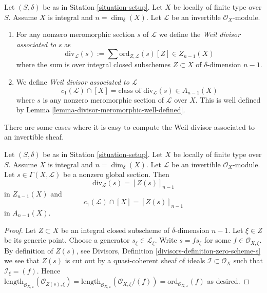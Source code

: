 \begin{definition}
\label{definition-divisor-invertible-sheaf}
Let $(S, \delta)$ be as in Sitation \ref{situation-setup}.
Let $X$ be locally of finite type over $S$. Assume $X$ is
integral and $n = \dim_\delta(X)$.
Let $\mathcal{L}$ be an invertible $\mathcal{O}_X$-module.
\begin{enumerate}
\item For any nonzero meromorphic section $s$ of $\mathcal{L}$
we define the {\it Weil divisor associated to $s$} as
$$
\text{div}_{\mathcal{L}}(s) :=
\sum \text{ord}_{Z, \mathcal{L}}(s) [Z] \in Z_{n - 1}(X)
$$
where the sum is over integral closed subschemes $Z \subset X$
of $\delta$-dimension $n - 1$.
\item We define {\it Weil divisor associated to $\mathcal{L}$}
$$
c_1(\mathcal{L}) \cap [X] =
\text{class of }\text{div}_{\mathcal{L}}(s) \in A_{n - 1}(X)
$$
where $s$ is any nonzero meromorphic section of $\mathcal{L}$ over
$X$. This is well defined by
Lemma \ref{lemma-divisor-meromorphic-well-defined}.
\end{enumerate}
\end{definition}

\noindent
There are some cases where it is easy to compute the
Weil divisor associated to an invertible sheaf.

\begin{lemma}
\label{lemma-compute-c1}
Let $(S, \delta)$ be as in Sitation \ref{situation-setup}.
Let $X$ be locally of finite type over $S$. Assume $X$ is
integral and $n = \dim_\delta(X)$.
Let $\mathcal{L}$ be an invertible $\mathcal{O}_X$-module.
Let $s \in \Gamma(X, \mathcal{L})$ be a nonzero global section.
Then
$$
\text{div}_{\mathcal{L}}(s) = [Z(s)]_{n - 1}
$$
in $Z_{n - 1}(X)$ and
$$
c_1(\mathcal{L}) \cap [X] = [Z(s)]_{n - 1}
$$
in $A_{n - 1}(X)$.
\end{lemma}

\begin{proof}
Let $Z \subset X$ be an integral closed subscheme of
$\delta$-dimension $n - 1$. Let $\xi \in Z$ be its generic
point. Choose a generator $s_\xi \in \mathcal{L}_\xi$.
Write $s = fs_\xi$ for some $f \in \mathcal{O}_{X, \xi}$.
By definition of $Z(s)$, see
Divisors, Definition \ref{divisors-definition-zero-scheme-s}
we see that $Z(s)$ is cut out by a quasi-coherent
sheaf of ideals $\mathcal{I} \subset \mathcal{O}_X$ such
that $\mathcal{I}_\xi = (f)$. Hence
$\text{length}_{\mathcal{O}_{X, x}}(\mathcal{O}_{Z(s), \xi})
=
\text{length}_{\mathcal{O}_{X, x}}(\mathcal{O}_{X, \xi}/(f))
=
\text{ord}_{\mathcal{O}_{X, x}}(f)$ as desired.
\end{proof}

